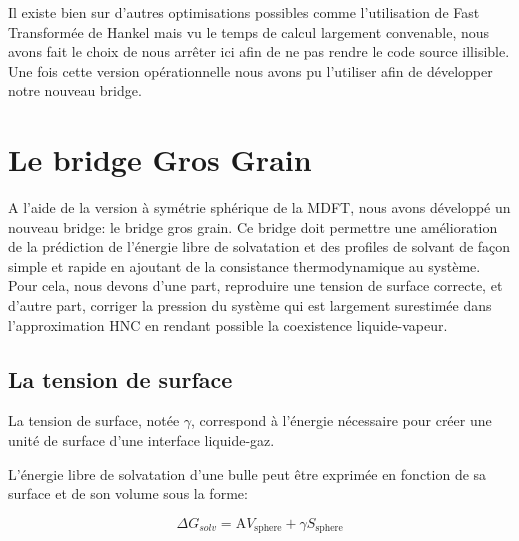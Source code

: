 Il existe bien sur d'autres optimisations possibles comme l'utilisation de Fast Transformée de Hankel mais vu le temps de calcul largement convenable, nous avons fait le choix de nous arrêter ici afin de ne pas rendre le code source illisible. Une fois cette version opérationnelle nous avons pu l'utiliser afin de développer notre nouveau bridge.



\section{Le bridge Gros Grain}
A l'aide de la version à symétrie sphérique de la MDFT, nous avons développé un nouveau bridge: le bridge gros grain. Ce bridge doit permettre une amélioration de la prédiction de l'énergie libre de solvatation et des profiles de solvant de façon simple et rapide en ajoutant de la consistance thermodynamique au système. Pour cela, nous devons d'une part, reproduire une tension de surface correcte, et d'autre part, corriger la pression du système qui est largement surestimée dans l'approximation HNC en rendant possible la coexistence liquide-vapeur. 

\subsection{La tension de surface}
La tension de surface, notée $\gamma$, correspond à l'énergie nécessaire pour créer une unité de surface d'une interface liquide-gaz.

L'énergie libre de solvatation d'une bulle peut être exprimée en fonction de sa surface et de son volume sous la forme:

\begin{equation} \label{eq:energie_libre_terme_volume_surface}
\Delta G_{solv}= \mathrm{A} V_{\mathrm{sphere}} + \gamma S_{\mathrm{sphere}} 
\end{equation}

